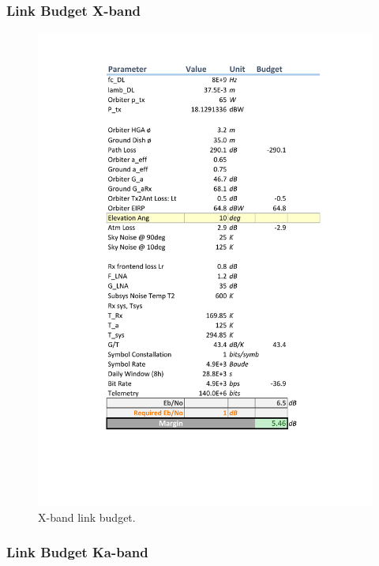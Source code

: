 \subsubsection{Link Budget X-band}

\begin{figure}[H]
	\centering
	\includegraphics[width=\textwidth]{figures/comms/linkBudget-Xband}
	\caption{X-band link budget.}
	\label{fig:budget-X}
\end{figure}

\subsubsection{Link Budget Ka-band}

